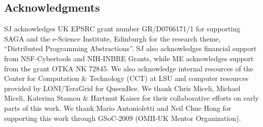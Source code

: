 \documentclass[3p,twocolumn]{elsarticle}
\begin{document}







\subsection*{Acknowledgments}

\small{ SJ acknowledges UK EPSRC grant number GR/D0766171/1 for
supporting SAGA and the e-Science Institute, Edinburgh for the
research theme, ``Distributed Programming Abstractions''.  SJ also
acknowledges financial support from NSF-Cybertools and NIH-INBRE
Grants, while ME acknowledges support from the grant OTKA NK 72845.
We also acknowledge internal resources of the Center for Computation
\& Technology (CCT) at LSU and computer resources provided by
LONI/TeraGrid for QueenBee.  We thank Chris Miceli, Michael Miceli,
Katerina Stamou \& Hartmut Kaiser for their collaborative efforts on
early parts of this work. We thank Mario Antonioletti and Neil Chue
Hong for supporting this work through GSoC-2009 (OMII-UK Mentor
Organization).}



\end{document}
